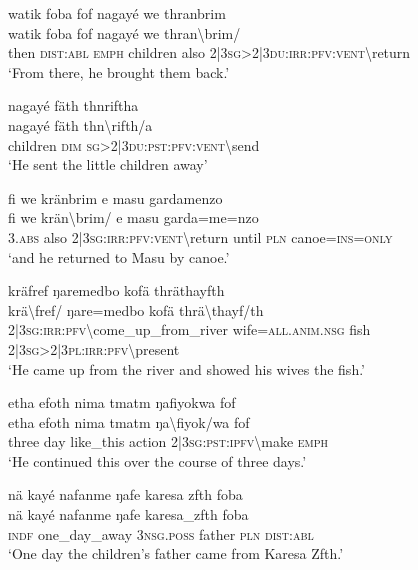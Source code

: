 \ea\label{ex:9:a2292}
watik foba fof nagayé we thranbrim\\
\gll watik	foba	fof	nagayé	we	thran{\textbackslash}brim/\\
     then	\textsc{dist}:\textsc{abl}	\textsc{emph}	children	also	2|3\textsc{sg}>2|3\textsc{du}:\textsc{irr}:\textsc{pfv}:\textsc{vent}{\textbackslash}return\\
\glt `From there, he brought them back.'
\z

\ea\label{ex:9:a2293}
nagayé fäth thnriftha\\
\gll nagayé	fäth	thn{\textbackslash}rifth/a\\
     children	\textsc{dim}	\textsc{sg}>2|3\textsc{du}:\textsc{pst}:\textsc{pfv}:\textsc{vent}{\textbackslash}send\\
\glt `He sent the little children away'
\z

\ea\label{ex:9:a2294}
fi we kränbrim e masu gardamenzo\\
\gll fi	we	krän{\textbackslash}brim/	e	masu	garda=me=nzo\\
     3.\textsc{abs}	also	2|3\textsc{sg}:\textsc{irr}:\textsc{pfv}:\textsc{vent}{\textbackslash}return	until	\textsc{pln}	canoe=\textsc{ins}=\textsc{only}\\
\glt `and he returned to Masu by canoe.'
\z

\newpage
\ea\label{ex:9:a2296}
kräfref ŋaremedbo kofä thräthayfth\\
\gll krä{\textbackslash}fref/	ŋare=medbo	kofä	thrä{\textbackslash}thayf/th\\
     2|3\textsc{sg}:\textsc{irr}:\textsc{pfv}{\textbackslash}come\_up\_from\_river	wife=\textsc{all}.\textsc{anim}.\textsc{nsg}	fish	2|3\textsc{sg}>2|3\textsc{pl}:\textsc{irr}:\textsc{pfv}{\textbackslash}present\\
\glt `He came up from the river and showed his wives the fish.'
\z

\ea\label{ex:9:a2298}
etha efoth nima tmatm ŋafiyokwa fof\\
\gll etha	efoth	nima	tmatm	ŋa{\textbackslash}fiyok/wa	fof\\
     three	day	like\_this	action	2|3\textsc{sg}:\textsc{pst}:\textsc{ipfv}{\textbackslash}make	\textsc{emph}\\
\glt `He continued this over the course of three days.'
\z

\ea\label{ex:9:a2300}
nä kayé nafanme ŋafe karesa zfth foba\\
\gll nä	kayé	nafanme	ŋafe	karesa\_zfth	foba\\
     \textsc{indf}	one\_day\_away	3\textsc{nsg}.\textsc{poss}	father	\textsc{pln}	\textsc{dist}:\textsc{abl}\\
\glt `One day the children's father came from Karesa Zfth.'
\z

